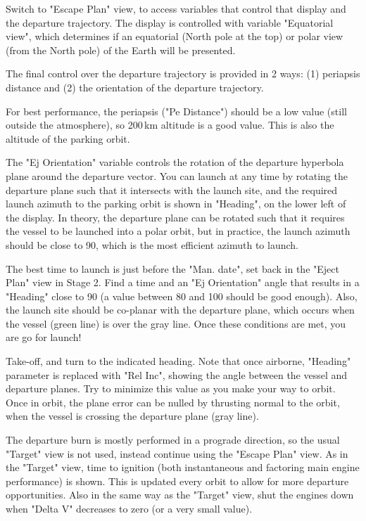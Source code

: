 \documentclass[Orbiter User Manual.tex]{subfiles}
\begin{document}
Switch to "Escape Plan" view, to access variables that control that display and
the departure trajectory. The display is controlled with variable "Equatorial
view", which determines if an equatorial (North pole at the top) or polar view
(from the North pole) of the Earth will be presented.

The final control over the departure trajectory is provided in 2 ways: (1)
periapsis distance and (2) the orientation of the departure trajectory.

For best performance, the periapsis ("Pe Distance") should be a low value (still
outside the atmosphere), so 200\,km altitude is a good value. This is also the
altitude of the parking orbit.

The "Ej Orientation" variable controls the rotation of the departure hyperbola
plane around the departure vector. You can launch at any time by rotating the
departure plane such that it intersects with the launch site, and the required
launch azimuth to the parking orbit is shown in "Heading", on the lower left of
the display. In theory, the departure plane can be rotated such that it requires
the vessel to be launched into a polar orbit, but in practice, the launch
azimuth should be close to 90\deg{}, which is the most efficient azimuth to
launch.

The best time to launch is just before the "Man. date", set back in the "Eject
Plan" view in Stage 2. Find a time and an "Ej Orientation" angle that results in
a "Heading" close to 90\deg{} (a value between 80\deg{} and 100\deg{} should be
good enough). Also, the launch site should be co-planar with the departure
plane, which occurs when the vessel (green line) is over the gray line. Once
these conditions are met, you are go for launch!

Take-off, and turn to the indicated heading. Note that once airborne, "Heading"
parameter is replaced with "Rel Inc", showing the angle between the vessel and
departure planes. Try to minimize this value as you make your way to orbit. Once
in orbit, the plane error can be nulled by thrusting normal to the orbit, when
the vessel is crossing the departure plane (gray line).

The departure burn is mostly performed in a prograde direction, so the usual
"Target" view is not used, instead continue using the "Escape Plan" view. As in
the "Target" view, time to ignition (both instantaneous and factoring main
engine performance) is shown. This is updated every orbit to allow for more
departure opportunities. Also in the same way as the "Target" view, shut the
engines down when "Delta V" decreases to zero (or a very small value).
\end{document}
